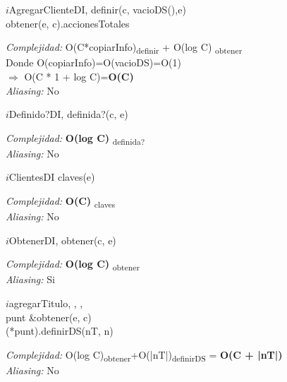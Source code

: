 \begin{algorithm}{$i$AgregarClienteDI}{, }{}
				definir(c, vacioDS(),e) 			\\	
				obtener(e, c).accionesTotales \\
			\end{algorithm}
	\textit{Complejidad:} O(C*copiarInfo)\textsubscript{definir} + O(log C) \textsubscript{obtener}\\
	 Donde O(copiarInfo)=O(vacioDS)=O(1)\\
	$\Rightarrow$ O(C * 1 + log C)=\textbf{O(C)}\\
	\textit{Aliasing:} No \\
				
\begin{algorithm}{$i$Definido?DI}{, }{}
				\RETURN definida?(c, e)
			\end{algorithm}	
	\textit{Complejidad:} \textbf{O(log C)} \textsubscript{definida?}\\		
	\textit{Aliasing:} No \\
			
\begin{algorithm}{$i$ClientesDI}{}{}
				\RETURN claves(e)		
			\end{algorithm}	
			\textit{Complejidad:} \textbf{\textbf{O(C)}} \textsubscript{claves}\\	
	\textit{Aliasing:} No \\	
			
\begin{algorithm}{$i$ObtenerDI}{, }{}
				\RETURN obtener(c, e)	
			\end{algorithm}
			\textit{Complejidad:} \textbf{O(log C)} \textsubscript{obtener}\\	
	\textit{Aliasing:} Si \\	
			
\begin{algorithm}{$i$agregarTitulo}{, , , }{}
				 \\
				punt \leftarrow \&obtener(e, c)\\
				(*punt).definirDS(nT, n)
			\end{algorithm}
			\textit{Complejidad:} O(log C)\textsubscript{obtener}+O(|nT|)\textsubscript{definirDS} = \textbf{O(C + |nT|)}\\
	\textit{Aliasing:} No \\
			\\
						
